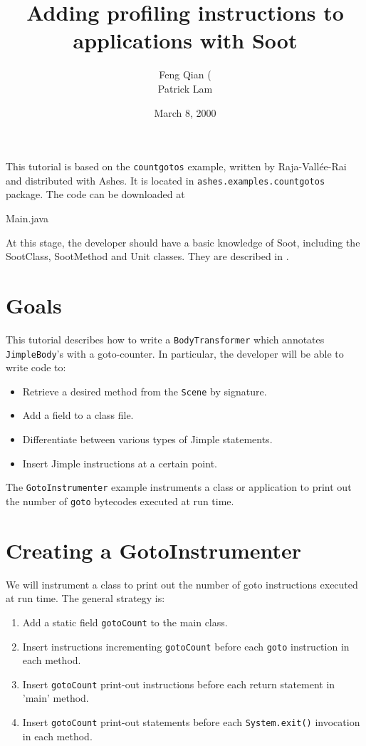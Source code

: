 \documentclass{article}
\title{Adding profiling instructions to applications with Soot}
\author{Feng Qian (\htmladdnormallink{fqian@sable.mcgill.ca)}{mailto:fqian@sable.mcgill.ca}\\
Patrick Lam \htmladdnormallink{(plam@sable.mcgill.ca)}{mailto:plam@sable.mcgill.ca}}
\date{March 8, 2000}
\begin{document}
\maketitle

This tutorial is based on the {\tt countgotos} example, written by
Raja-Vall\'ee-Rai and distributed with Ashes.  It is located in
{\tt ashes.examples.countgotos} package. The code can be downloaded at

{Main.java}

At this stage, the developer should have a basic knowledge of Soot,
including the SootClass, SootMethod and Unit classes.  They are
described in .

\section{Goals}

This tutorial describes how to write a {\tt BodyTransformer} which annotates
{\tt JimpleBody}'s with a goto-counter.  In particular, the developer will be
able to write code to:
\begin{itemize}
\item Retrieve a desired method from the {\tt Scene} by signature.
\item Add a field to a class file.
\item Differentiate between various types of Jimple statements.
\item Insert Jimple instructions at a certain point.
\end{itemize}

The {\tt GotoInstrumenter} example instruments a class or application to print
out the number of {\tt goto} bytecodes executed at run time. 

\section{Creating a GotoInstrumenter}

We will instrument a class to print out the number of goto
instructions executed at run time. The general strategy is:

\begin{enumerate}
\item Add a static field {\tt gotoCount} to the main class.
\item Insert instructions incrementing {\tt gotoCount} before each
{\tt goto} instruction in each method.
\item Insert {\tt gotoCount} print-out instructions before each 
return statement in 'main' method.
\item Insert {\tt gotoCount} print-out statements before each
{\tt System.exit()} invocation in each method.
\end{enumerate}
\end{document}
